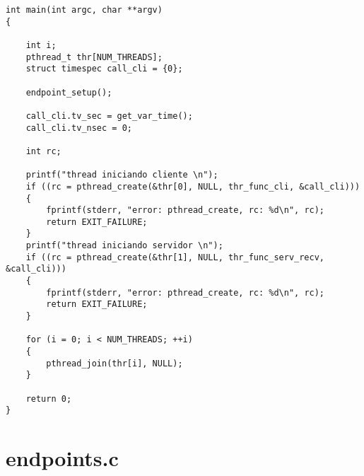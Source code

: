 \begin{lstlisting}
int main(int argc, char **argv)
{
	
	int i;
	pthread_t thr[NUM_THREADS];
	struct timespec call_cli = {0};
	
	endpoint_setup();
	
	call_cli.tv_sec = get_var_time();
	call_cli.tv_nsec = 0;
	
	int rc;
	
	printf("thread iniciando cliente \n");
	if ((rc = pthread_create(&thr[0], NULL, thr_func_cli, &call_cli)))
	{
		fprintf(stderr, "error: pthread_create, rc: %d\n", rc);
		return EXIT_FAILURE;
	}
	printf("thread iniciando servidor \n");
	if ((rc = pthread_create(&thr[1], NULL, thr_func_serv_recv, &call_cli)))
	{
		fprintf(stderr, "error: pthread_create, rc: %d\n", rc);
		return EXIT_FAILURE;
	}
	
	for (i = 0; i < NUM_THREADS; ++i)
	{
		pthread_join(thr[i], NULL);
	}
	
	return 0;
}
\end{lstlisting}

\tocless\section{endpoints.c}

